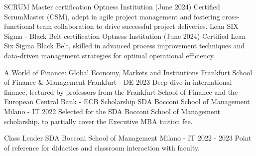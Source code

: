 
\begin{cventries}
  \cventry
  {SCRUM Master certification} %
  {Optness Institution} %
  {}
  {} %
  {(June 2024)} %
  {
    Certified ScrumMaster (CSM), adept in agile project management and fostering cross-functional team collaboration to drive successful project deliveries.
  }
  \cventry
  {Lean SIX Sigma - Black Belt certification} %
  {Optness Institution} %
  {}
  {} %
  {(June 2024)} %
  {
    Certified Lean Six Sigma Black Belt, skilled in advanced process improvement techniques and data-driven management strategies for optimal operational efficiency.
  }
    
  \cventry
  {A World of Finance: Global Economy, Markets and Institutions} %
  {Frankfurt School of Finance \& Management} %
  {}
  {Frankfurt - DE} %
  {2023} %
  {
    Deep dive in international finance, lectured by professors from the Frankfurt School of Finance and the European Central Bank - ECB
  }
  \cventry
    {Scholarship} %
    {SDA Bocconi School of Management} %
    {}
    {Milano - IT} %
    {2022} %
    {
      Selected for the SDA Bocconi School of Management scholarship, to partially cover the Executive MBA tuition fee.
    }
    
  \cventry
  {Class Leader} %
  {SDA Bocconi School of Management} %
  {}
  {Milano - IT} %
  {2022 - 2023} %
  {
    Point of reference for didactics and classroom interaction with faculty.
  }
\end{cventries}